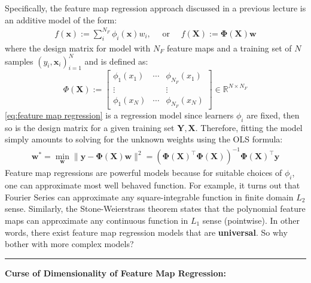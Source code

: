 \documentclass[11pt]{article}
\theoremstyle{plain} %
\theoremstyle{remark}
\begin{document}
Specifically, the feature map regression approach discussed in a previous lecture is an
additive model of the form:
\begin{align}
  f(\mathbf{x}):=\sum_{i}^{N_{F}} \phi_{i}(\mathbf{x}) w_{i}, \quad \text { or } \quad f(\mathbf{X}):=\mathbf{\Phi}(\mathbf{X}) \mathbf{w}
  \label{eq:feature map regression}
\end{align}
where the design matrix for model with $N_{F}$ feature maps and a training set
of $N$ samples $\left(y_{i}, \mathbf{x}_{i}\right)_{i=1}^{N}$ and is defined as:
$$
  \Phi(\mathbf{X}):=\left[\begin{array}{ccc}
      \phi_{1}\left(x_{1}\right) & \cdots & \phi_{N_{F}}\left(x_{1}\right) \\
      \vdots                     &        & \vdots                         \\
      \phi_{1}\left(x_{N}\right) & \cdots & \phi_{N_{F}}\left(x_{N}\right)
    \end{array}\right] \in \mathbb{R}^{N \times N_{F}}
$$
\cref{eq:feature map regression} is a regression model since learners $\phi_{i}$ are
fixed, then so is the design matrix for a given training set ${\mathbf{Y},
      \mathbf{X}}$. Therefore, fitting the model simply amounts to solving for the unknown weights
using the OLS formula:
\begin{align}
  \mathbf{w}^{*} =\min_{\mathbf{w}}\|\mathbf{y}-\mathbf{\Phi}(\mathbf{X}) \mathbf{w}\|^{2}
  =\left(\mathbf{\Phi}(\mathbf{X})^\top \mathbf{\Phi}(\mathbf{X})\right)^{-1} \mathbf{\Phi}(\mathbf{X})^\top \mathbf{y}
  \label{eq:feature map estimator}
\end{align}
Feature map regressions are powerful models because for suitable choices of
$\phi_{i}$, one can approximate most well behaved function.
For example, it turns out that Fourier Series can approximate any
square-integrable function in finite domain $L_{2}$ sense.
Similarly, the Stone-Weierstrass theorem states that the polynomial feature maps
can approximate any continuous function in $L_{1}$ sense (pointwise).
In other words, there exist feature map regression models that are \textbf{universal}. So
why bother with more complex models?
\vspace*{0.6em}
\hrule

\textbf{Curse of Dimensionality of Feature Map Regression:}
\end{document}
